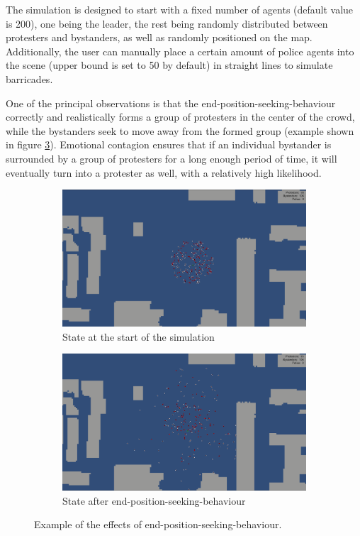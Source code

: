 \documentclass[9pt]{pnas-new}
\begin{document}
The simulation is designed to start with a fixed number of agents (default value is 200), one being the leader, the rest being randomly distributed between protesters and bystanders, as well as randomly positioned on the map. Additionally, the user can manually place a certain amount of police agents into the scene (upper bound is set to 50 by default) in straight lines to simulate barricades. 

\bigskip
One of the principal observations is that the end-position-seeking-behaviour correctly and realistically forms a group of protesters in the center of the crowd, while the bystanders seek to move away from the formed group (example shown in figure \ref{fig3}). Emotional contagion ensures that if an individual bystander is surrounded by a group of protesters for a long enough period of time, it will eventually turn into a protester as well, with a relatively high likelihood. 

\begin{figure}[H]
\centering
\begin{subfigure}{.5\textwidth}
  \centering
  \includegraphics[width=0.95\columnwidth]{before.png}
  \caption{State at the start of the simulation}
  \label{fig:sub1}
\end{subfigure}%
\begin{subfigure}{.5\textwidth}
  \centering
  \includegraphics[width=0.95\columnwidth]{after.png}
  \caption{State after end-position-seeking-behaviour}
  \label{fig:sub2}
\end{subfigure}
\caption{Example of the effects of end-position-seeking-behaviour.}
\label{fig3}
\end{figure}
\end{document}
